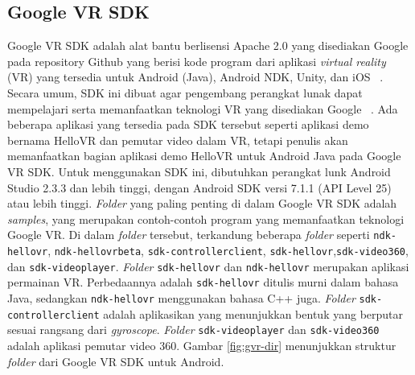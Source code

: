 \subsection{Google VR SDK}
Google VR SDK adalah alat bantu berlisensi Apache 2.0 yang disediakan Google pada repository Github yang berisi kode program dari aplikasi {\it virtual reality} (VR)  yang tersedia untuk Android (Java), Android NDK, Unity, dan iOS ~\cite{gvr-sdk-repo}. Secara umum, SDK ini dibuat agar pengembang perangkat lunak dapat mempelajari serta memanfaatkan teknologi VR yang disediakan Google ~\cite{quickstart-google-vr}. Ada beberapa aplikasi yang tersedia pada SDK tersebut seperti aplikasi demo bernama HelloVR dan pemutar video dalam VR, tetapi penulis akan memanfaatkan bagian aplikasi demo HelloVR untuk Android Java pada Google VR SDK. Untuk menggunakan SDK ini, dibutuhkan perangkat lunk Android Studio 2.3.3 dan lebih tinggi, dengan Android SDK versi 7.1.1 (API Level 25) atau lebih tinggi. \textit{Folder} yang paling penting di dalam Google VR SDK adalah \textit{samples}, yang merupakan contoh-contoh program yang memanfaatkan teknologi Google VR. Di dalam \textit{folder} tersebut, terkandung beberapa \textit{folder} seperti \texttt{ndk-hellovr}, \texttt{ndk-hellovrbeta}, \texttt{sdk-controllerclient}, \texttt{sdk-hellovr},\texttt{sdk-video360}, dan \texttt{sdk-videoplayer}. \textit{Folder} \texttt{sdk-hellovr} dan \texttt{ndk-hellovr} merupakan aplikasi permainan VR. Perbedaannya adalah \texttt{sdk-hellovr} ditulis murni dalam bahasa Java, sedangkan \texttt{ndk-hellovr} menggunakan bahasa C++ juga.  \textit{Folder} \texttt{sdk-controllerclient} adalah aplikasikan yang menunjukkan bentuk yang berputar sesuai rangsang dari \textit{gyroscope}. \textit{Folder} \texttt{sdk-videoplayer} dan \texttt{sdk-video360} adalah aplikasi pemutar video 360. Gambar \ref{fig:gvr-dir} menunjukkan struktur \textit{folder} dari Google VR SDK untuk Android. 

